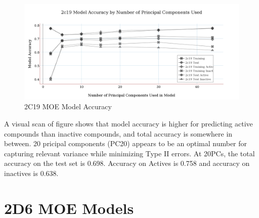 \begin{figure}[!htbp]
\includegraphics[width=1\textwidth]{../img/2c19_moe_model_accuracy.png}
\caption{2C19 MOE Model Accuracy}
\end{figure}

A visual scan of figure shows that model accuracy is higher for predicting active compounds than inactive compounds, and total accuracy is somewhere in between. 20 pricipal components (PC20) appears to be an optimal number for capturing relevant variance while minimizing Type II errors. At 20PCs, the total accuracy on the test set is 0.698. Accuracy on Actives is 0.758 and accuracy on inactives is 0.638.


\section{2D6 MOE Models}

